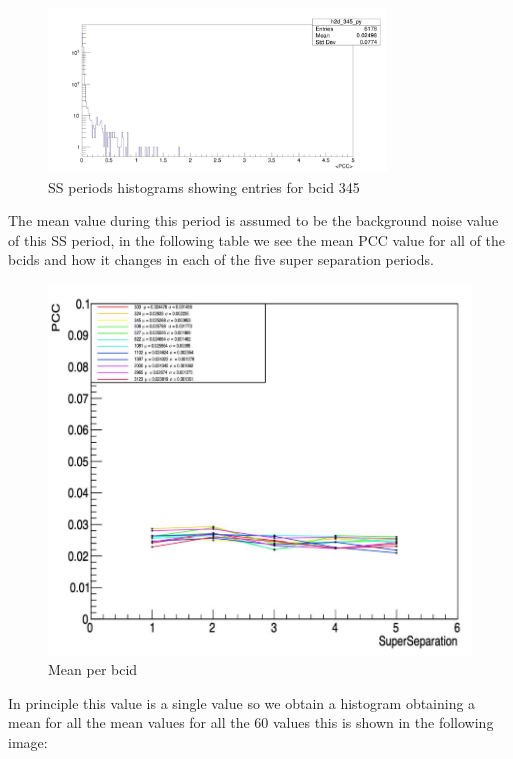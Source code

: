 \begin{figure}[H]
    \centering
    \includegraphics[height=0.4\textheight, width=0.8\textwidth]{sshist.png}
    \caption{SS periods histograms showing entries for bcid 345}
    \label{fig:SShist}
\end{figure}


The mean value during this period is assumed to be the background noise value of this SS period, in the following table we see the mean PCC value for all of the bcids and how it changes in each of the five super separation periods.

\begin{figure}[H]
    \centering
    \includegraphics[height=0.30\textheight,width=1\textwidth]{SSmean.png}
    \caption{Mean per bcid}
    \label{fig:SSmean}
\end{figure}

In principle this value is a single value so we obtain a histogram obtaining a mean for all the mean values for all the 60 values this is shown in the following image: 


